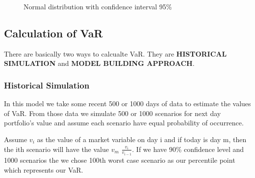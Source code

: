 \documentclass[11pt]{article}
\numberwithin{equation}{section}
\begin{document}
\begin{figure}[H]
		\centering
		\caption{Normal distribution with confidence interval 95\%}
		\label{fig:q1_f1_a}
\end{figure} 

\subsection{Calculation of VaR}
There are basically two ways to calcualte VaR. They are \textbf{HISTORICAL SIMULATION} and \textbf{MODEL BUILDING APPROACH}.
\pagebreak

	\subsubsection{Historical Simulation}
	\medskip
 In this model we take some recent 500 or 1000 days of data to estimate the values of VaR. From those data we simulate 500 or 1000 scenarios for next day portfolio's value and assume each scenario have equal probability of occurrence.\medskip
	
	\hspace{1cm} Assume  $v_i$ as the value of a market variable on day i and if today is day m, then the ith scenario will have the value $v_m$ $\frac{v_i}{v_{i-1}}$. If we have 90\% confidence level and 1000 scenarios the we chose 100th worst case scenario as our percentile point which represents our VaR. 
\end{document}
